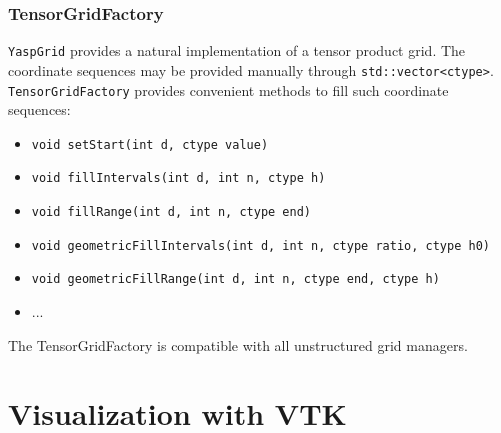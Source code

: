 \documentclass[aspectratio=169,11pt]{beamer}
\theoremstyle{definition}
\begin{document}
\begin{frame}
 \frametitle{TensorGridFactory}

 \lstinline!YaspGrid! provides a natural implementation of a tensor product grid.
 The coordinate sequences may be provided manually through \lstinline!std::vector<ctype>!.
 \lstinline!TensorGridFactory! provides convenient methods to fill such coordinate sequences:
 \begin{itemize}
  \item \lstinline!void setStart(int d, ctype value)!
  \item \lstinline!void fillIntervals(int d, int n, ctype h)!
  \item \lstinline!void fillRange(int d, int n, ctype end)!
  \item \lstinline!void geometricFillIntervals(int d, int n, ctype ratio, ctype h0)!
  \item \lstinline!void geometricFillRange(int d, int n, ctype end, ctype h)!
  \item ...
 \end{itemize}

 The TensorGridFactory is compatible with all unstructured grid managers.
\end{frame}

\section{Visualization with VTK}
\end{document}
